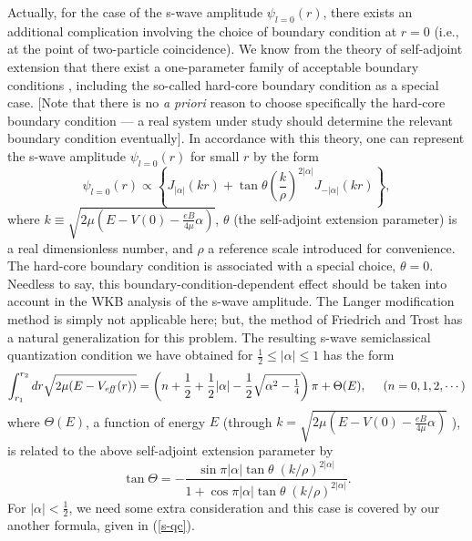 \documentclass[a4paper,aps,eqsecnum,preprint,preprintnumbers,12pt]{revtex4}
\begin{document}
Actually, for the case of the s-wave amplitude $\psi_{l=0}(r)$,
there exists an additional complication involving the choice of
boundary condition at $r=0$ (i.e., at the point of two-particle
coincidence). We know from the theory of self-adjoint extension
that there exist a one-parameter family of acceptable boundary
conditions \cite{albeverio}, including the so-called hard-core
boundary condition \cite{aharonov} as a special case. [Note that
there is no {\it a priori} reason to choose specifically the
hard-core boundary condition --- a real system under study should
determine the relevant boundary condition eventually]. In
accordance with this theory, one can represent the s-wave
amplitude $\psi_{l=0}(r)$ for small $r$ by the form
\begin{equation} \label{other}
\psi_{l=0}(r) \propto \left\{ J_{|\alpha|}(kr) + \tan \theta
\left( \frac{k}{\rho} \right)^{2|\alpha|} J_{-|\alpha|}(kr)
\right\},
\end{equation}
where $k \equiv \sqrt{ 2\mu ( E - V(0) - \frac{eB}{4\mu} \alpha )
}$, $\theta$ (the self-adjoint extension parameter) is a real
dimensionless number, and $\rho$ a reference scale introduced for
convenience. The hard-core boundary condition is associated with a
special choice, $\theta=0$. Needless to say, this
boundary-condition-dependent effect should be taken into account
in the WKB analysis of the s-wave amplitude. The Langer
modification method is simply not applicable here; but, the method
of Friedrich and Trost has a natural generalization for this
problem. The resulting s-wave semiclassical quantization condition
we have obtained for $\displaystyle \frac{1}{2} \leq |\alpha| \leq
1$ has the form
\begin{equation}
\int_{r_{1}}^{r_{2}} dr \sqrt{ 2\mu ( E - V_{\it eff}(r) ) } =
\left( n + \frac{1}{2} + \frac{1}{2} |\alpha| - \frac{1}{2} \sqrt{
\alpha^{2} - \textstyle \frac{1}{4} } \right) \pi + \Theta(E),
\;\;\;\;\; ( n = 0, 1, 2, \cdots )
\end{equation}
where $\Theta(E)$, a function of energy $E$ (through $k = \sqrt{
2\mu ( E - V(0) - \frac{eB}{4\mu} \alpha ) }$ ), is related to the
above self-adjoint extension parameter by
\begin{equation} \label{cthetas}
\tan\Theta = - \frac{ \sin\pi|\alpha| \tan\theta \;
(k/\rho)^{2|\alpha|} }{ 1 + \cos\pi|\alpha| \tan\theta \;
(k/\rho)^{2|\alpha|} }.
\end{equation}
For $|\alpha| < \displaystyle \frac{1}{2}$, we need some extra
consideration and this case is covered by our another formula,
given in (\ref{s-qc}).
\end{document}
